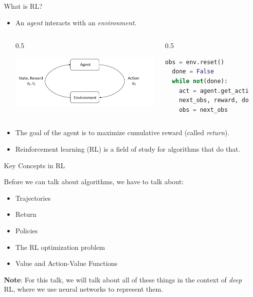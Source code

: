 \documentclass[9pt]{beamer}
\begin{document}
\begin{frame}[fragile]{What is RL?}

\begin{itemize}
\item An \textit{agent} interacts with an \textit{environment}. 
\begin{columns}
\begin{column}{0.5\textwidth}
    \begin{center}
     \includegraphics[width=\textwidth]{rl_diagram}
     \end{center}
\end{column}
\begin{column}{0.5\textwidth}  %
\begin{lstlisting}[language=python]
  obs = env.reset()
  done = False
  while not(done):
  	act = agent.get_action(obs)
  	next_obs, reward, done, info = env.step(act)
  	obs = next_obs
\end{lstlisting}
\end{column}
\end{columns}
\item The goal of the agent is to maximize cumulative reward (called \textit{return}). 
\item Reinforcement learning (RL) is a field of study for algorithms that do that.
\end{itemize}

\end{frame}


\begin{frame}{Key Concepts in RL}

Before we can talk about algorithms, we have to talk about:
\begin{itemize}
\item Trajectories
\item Return
\item Policies
\item The RL optimization problem
\item Value and Action-Value Functions
\end{itemize}

\textbf{Note}: For this talk, we will talk about all of these things in the context of \textit{deep} RL, where we use neural networks to represent them.

\end{frame}
\end{document}
